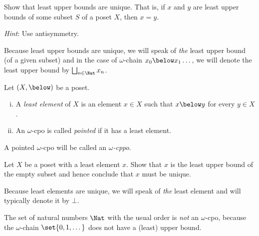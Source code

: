 \begin{exercise}\label{exer:least-upper-bounds-are-unique}
  Show that least upper bounds are unique. That is, if \(x\) and \(y\) are least
  upper bounds of some subset \(S\) of a poset \(X\), then \(x = y\).

  \emph{Hint}: Use antisymmetry.
\end{exercise}

Because least upper bounds are unique, we will speak of \emph{the} least upper
bound (of a given subset) and in the case of \(\omega\)-chain
\(x_0 \below x_1 \dots\), we will denote the least upper bound by
\(\bigsqcup_{n \in \Nat}x_n\).

\begin{definition}
  Let \((X,{\below})\) be a poset.
  \begin{enumerate}[(i)]
  \item A \emph{least element} of \(X\) is an element \(x \in X\) such that
    \(x \below y\) for every \(y \in X\).
  \item An \(\omega\)-cpo is called \emph{pointed} if it has a least element.
  \end{enumerate}
  A pointed \(\omega\)-cpo will be called an \emph{\(\omega\)-cppo}.
\end{definition}

\begin{exercise}\label{exer:least-element-is-unique}
  Let \(X\) be a poset with a least element \(x\). Show that \(x\) is the least
  upper bound of the empty subset and hence conclude that \(x\) must be unique.
\end{exercise}

Because least elements are unique, we will speak of \emph{the} least element and
will typically denote it by \(\bot\).

\begin{example}
  The set of natural numbers \(\Nat\) with the usual order is \emph{not} an
  \(\omega\)-cpo, because the \(\omega\)-chain
  \(\set{0,1,\dots}\) does not have a (least) upper bound.
\end{example}

